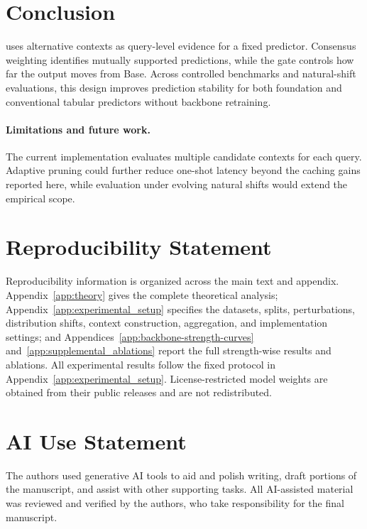 \section{Conclusion}
\label{sec:conclusion}

\method{} uses alternative contexts as query-level evidence for a fixed
predictor. Consensus weighting identifies mutually supported predictions,
while the gate controls how far the output moves from Base. Across controlled
benchmarks and natural-shift evaluations, this design improves prediction
stability for both foundation and conventional tabular predictors without
backbone retraining.

\paragraph{Limitations and future work.}
The current implementation evaluates multiple candidate contexts for each
query. Adaptive pruning could further reduce one-shot latency beyond the caching
gains reported here, while evaluation under evolving natural shifts would
extend the empirical scope.

\section*{Reproducibility Statement}

Reproducibility information is organized across the main text and appendix.
Appendix~\ref{app:theory} gives the complete theoretical analysis;
Appendix~\ref{app:experimental_setup} specifies the datasets, splits,
perturbations, distribution shifts, context construction, aggregation, and
implementation settings; and Appendices~\ref{app:backbone-strength-curves}
and~\ref{app:supplemental_ablations} report the full strength-wise results and
ablations.  All experimental results follow the fixed protocol in
Appendix~\ref{app:experimental_setup}.  License-restricted model weights are
obtained from their public releases and are not redistributed.

\section*{AI Use Statement}

The authors used generative AI tools to aid and polish writing, draft portions
of the manuscript, and assist with other supporting tasks. All AI-assisted
material was reviewed and verified by the authors, who
take responsibility for the final manuscript.
